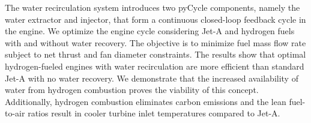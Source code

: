 \documentclass[conf]{new-aiaa}
\begin{document}
The water recirculation system introduces two pyCycle components, namely the water extractor and injector, that form a continuous closed-loop feedback cycle in the engine.
We optimize the engine cycle considering Jet-A and hydrogen fuels with and without water recovery.
The objective is to minimize fuel mass flow rate subject to net thrust and fan diameter constraints.
The results show that optimal hydrogen-fueled engines with water recirculation are more efficient than standard Jet-A with no water recovery.
We demonstrate that the increased availability of water from hydrogen combustion proves the viability of this concept.
Additionally, hydrogen combustion eliminates carbon emissions and the lean fuel-to-air ratios result in cooler turbine inlet temperatures compared to Jet-A.
\end{document}
